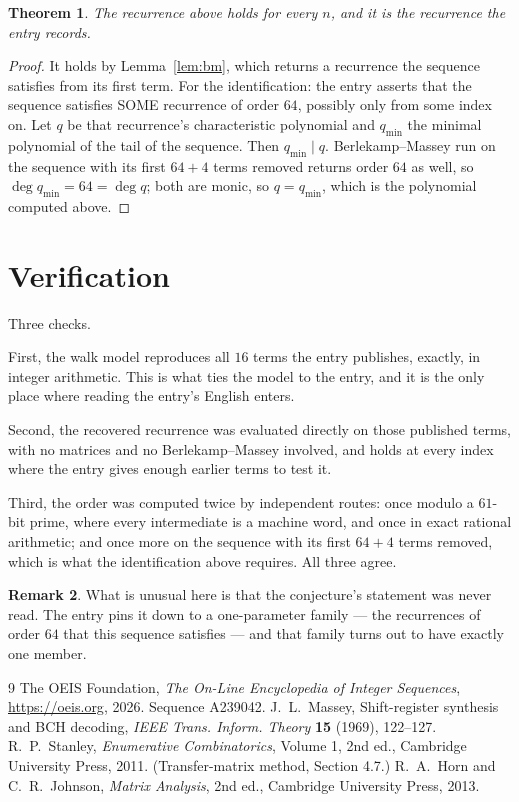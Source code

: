 \documentclass[11pt,a4paper]{article}
\theoremstyle{plain}
\newtheorem{theorem}{Theorem}
\theoremstyle{definition}
\newtheorem{remark}[theorem]{Remark}
\begin{document}
\begin{theorem}
The recurrence above holds for every $n$, and it is the recurrence the entry records.
\end{theorem}

\begin{proof}
It holds by Lemma~\ref{lem:bm}, which returns a recurrence the sequence satisfies from its
first term. For the identification: the entry asserts that the sequence satisfies SOME
recurrence of order $64$, possibly only from some index on. Let $q$ be that recurrence's
characteristic polynomial and $q_{\min}$ the minimal polynomial of the tail of the sequence.
Then $q_{\min}\mid q$. Berlekamp--Massey run on the sequence with its first $64+4$ terms
removed returns order $64$ as well, so $\deg q_{\min}=64=\deg q$; both are monic, so
$q=q_{\min}$, which is the polynomial computed above.
\end{proof}

\section{Verification}

Three checks.

First, the walk model reproduces all $16$ terms the entry publishes, exactly, in integer
arithmetic. This is what ties the model to the entry, and it is the only place where reading
the entry's English enters.

Second, the recovered recurrence was evaluated directly on those published terms, with no
matrices and no Berlekamp--Massey involved, and holds at every index where the entry gives
enough earlier terms to test it.

Third, the order was computed twice by independent routes: once modulo a $61$-bit prime, where
every intermediate is a machine word, and once in exact rational arithmetic; and once more on
the sequence with its first $64+4$ terms removed, which is what the identification above
requires. All three agree.

\begin{remark}
What is unusual here is that the conjecture's statement was never read. The entry pins it down
to a one-parameter family --- the recurrences of order $64$ that this sequence satisfies
--- and that family turns out to have exactly one member.
\end{remark}

\begin{thebibliography}{9}
 The OEIS Foundation, \emph{The On-Line Encyclopedia of Integer
Sequences}, \url{https://oeis.org}, 2026. Sequence A239042.
 J.~L.~Massey, Shift-register synthesis and BCH decoding, \emph{IEEE
Trans. Inform. Theory} \textbf{15} (1969), 122--127.
 R.~P.~Stanley, \emph{Enumerative Combinatorics}, Volume 1, 2nd ed.,
Cambridge University Press, 2011. (Transfer-matrix method, Section 4.7.)
 R.~A.~Horn and C.~R.~Johnson, \emph{Matrix Analysis}, 2nd ed., Cambridge
University Press, 2013.
\end{thebibliography}
\end{document}
